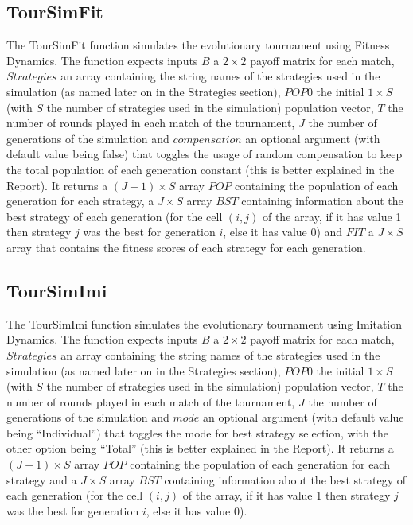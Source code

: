 \documentclass[12pt]{article}
\begin{document}
\subsection{TourSimFit}
The TourSimFit function simulates the evolutionary tournament using Fitness Dynamics. The function expects inputs $B$ a $2 \times 2$ payoff matrix for each match, $Strategies$ an array containing the string names of the strategies used in the simulation (as named later on in the Strategies section), $POP0$ the initial $1 \times S$ (with $S$ the number of strategies used in the simulation) population vector, $T$ the number of rounds played in each match of the tournament, $J$ the number of generations of the simulation and $compensation$ an optional argument (with default value being false) that toggles the usage of random compensation to keep the total population of each generation constant (this is better explained in the Report). It returns a $(J+1) \times S$ array $POP$ containing the population of each generation for each strategy, a $J \times S$ array $BST$ containing information about the best strategy of each generation (for the cell $(i,j)$ of the array, if it has value 1 then strategy $j$ was the best for generation $i$, else it has value 0) and $FIT$ a $J \times S$ array that contains the fitness scores of each strategy for each generation.

\subsection{TourSimImi}
The TourSimImi function simulates the evolutionary tournament using Imitation Dynamics. The function expects inputs $B$ a $2 \times 2$ payoff matrix for each match, $Strategies$ an array containing the string names of the strategies used in the simulation (as named later on in the Strategies section), $POP0$ the initial $1 \times S$ (with $S$ the number of strategies used in the simulation) population vector, $T$ the number of rounds played in each match of the tournament, $J$ the number of generations of the simulation and $mode$ an optional argument (with default value being ``Individual'') that toggles the mode for best strategy selection, with the other option being ``Total'' (this is better explained in the Report). It returns a $(J+1) \times S$ array $POP$ containing the population of each generation for each strategy and a $J \times S$ array $BST$ containing information about the best strategy of each generation (for the cell $(i,j)$ of the array, if it has value 1 then strategy $j$ was the best for generation $i$, else it has value 0).
\end{document}
